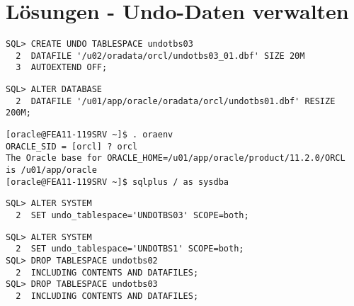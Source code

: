 \section{Lösungen - Undo-Daten verwalten}
  \begin{enumerate}
    
      \begin{lstlisting}[language=oracle_sql]
SQL> CREATE UNDO TABLESPACE undotbs03
  2  DATAFILE '/u02/oradata/orcl/undotbs03_01.dbf' SIZE 20M
  3  AUTOEXTEND OFF;
      \end{lstlisting}
    
      \begin{enumerate}
        
          \begin{lstlisting}[language=oracle_sql]
SQL> ALTER DATABASE
  2  DATAFILE '/u01/app/oracle/oradata/orcl/undotbs01.dbf' RESIZE 200M;
          \end{lstlisting}
        
          \begin{lstlisting}[language=terminal]
[oracle@FEA11-119SRV ~]$ . oraenv
ORACLE_SID = [orcl] ? orcl
The Oracle base for ORACLE_HOME=/u01/app/oracle/product/11.2.0/ORCL
is /u01/app/oracle
[oracle@FEA11-119SRV ~]$ sqlplus / as sysdba
          \end{lstlisting}
        
        
        
          \begin{lstlisting}[language=oracle_sql]
SQL> ALTER SYSTEM
  2  SET undo_tablespace='UNDOTBS03' SCOPE=both;
          \end{lstlisting}
        
      \end{enumerate}
    
      \begin{lstlisting}[language=oracle_sql]
SQL> ALTER SYSTEM
  2  SET undo_tablespace='UNDOTBS1' SCOPE=both;
SQL> DROP TABLESPACE undotbs02
  2  INCLUDING CONTENTS AND DATAFILES;
SQL> DROP TABLESPACE undotbs03
  2  INCLUDING CONTENTS AND DATAFILES;
      \end{lstlisting}
  \end{enumerate}
